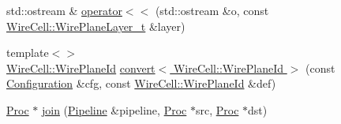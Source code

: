 \begin{DoxyCompactItemize}
\item 
std\+::ostream \& \hyperlink{namespace_wire_cell_a9f35d6b6f8b4ed877efb37690b51803f}{operator$<$$<$} (std\+::ostream \&o, const \hyperlink{namespace_wire_cell_a761397ff086f0a7e1a1d9ccd251ac618}{Wire\+Cell\+::\+Wire\+Plane\+Layer\+\_\+t} \&layer)
\item 
{\footnotesize template$<$$>$ }\\\hyperlink{class_wire_cell_1_1_wire_plane_id}{Wire\+Cell\+::\+Wire\+Plane\+Id} \hyperlink{namespace_wire_cell_ac5c430ec5c4c9bbb7437f281d4094c4f}{convert$<$ Wire\+Cell\+::\+Wire\+Plane\+Id $>$} (const \hyperlink{namespace_wire_cell_a9f705541fc1d46c608b3d32c182333ee}{Configuration} \&cfg, const \hyperlink{class_wire_cell_1_1_wire_plane_id}{Wire\+Cell\+::\+Wire\+Plane\+Id} \&def)
\item 
\hyperlink{class_wire_cell_1_1_proc}{Proc} $\ast$ \hyperlink{namespace_wire_cell_ae2a1084afa4709a44b48a25097f5e231}{join} (\hyperlink{namespace_wire_cell_a7f9ab409f961e35f837782a615c0020f}{Pipeline} \&pipeline, \hyperlink{class_wire_cell_1_1_proc}{Proc} $\ast$src, \hyperlink{class_wire_cell_1_1_proc}{Proc} $\ast$dst)
\end{DoxyCompactItemize}
